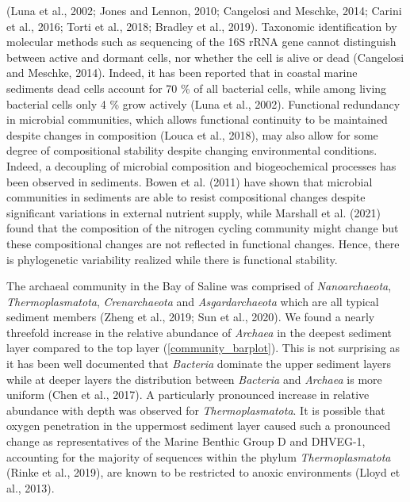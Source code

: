 \documentclass[12pt,]{article}
\begin{document}
(Luna et al., 2002; Jones and Lennon, 2010; Cangelosi and Meschke, 2014;
Carini et al., 2016; Torti et al., 2018; Bradley et al., 2019).
Taxonomic identification by molecular methods such as sequencing of the
16S rRNA gene cannot distinguish between active and dormant cells, nor
whether the cell is alive or dead (Cangelosi and Meschke, 2014). Indeed,
it has been reported that in coastal marine sediments dead cells account
for 70 \si{\percent} of all bacterial cells, while among living
bacterial cells only 4 \si{\percent} grow actively (Luna et al., 2002).
Functional redundancy in microbial communities, which allows functional
continuity to be maintained despite changes in composition (Louca et
al., 2018), may also allow for some degree of compositional stability
despite changing environmental conditions. Indeed, a decoupling of
microbial composition and biogeochemical processes has been observed in
sediments. Bowen et al. (2011) have shown that microbial communities in
sediments are able to resist compositional changes despite significant
variations in external nutrient supply, while Marshall et al. (2021)
found that the composition of the nitrogen cycling community might
change but these compositional changes are not reflected in functional
changes. Hence, there is phylogenetic variability realized while there
is functional stability.

The archaeal community in the Bay of Saline was comprised of
\emph{Nanoarchaeota}, \emph{Thermoplasmatota}, \emph{Crenarchaeota} and
\emph{Asgardarchaeota} which are all typical sediment members (Zheng et
al., 2019; Sun et al., 2020). We found a nearly threefold increase in
the relative abundance of \emph{Archaea} in the deepest sediment layer
compared to the top layer (\autoref{community_barplot}). This is not
surprising as it has been well documented that \emph{Bacteria} dominate
the upper sediment layers while at deeper layers the distribution
between \emph{Bacteria} and \emph{Archaea} is more uniform (Chen et al.,
2017). A particularly pronounced increase in relative abundance with
depth was observed for \emph{Thermoplasmatota}. It is possible that
oxygen penetration in the uppermost sediment layer caused such a
pronounced change as representatives of the Marine Benthic Group D and
DHVEG-1, accounting for the majority of sequences within the phylum
\emph{Thermoplasmatota} (Rinke et al., 2019), are known to be restricted
to anoxic environments (Lloyd et al., 2013).
\end{document}
